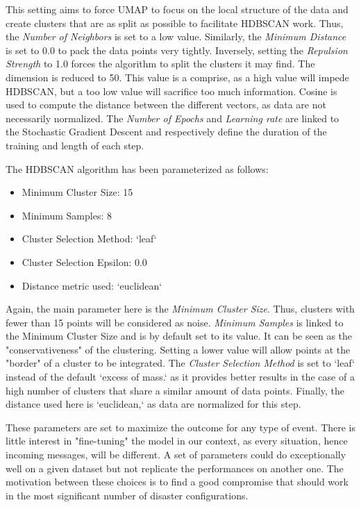 This setting aims to force UMAP to focus on the local structure of the data and create clusters that are as split as possible to facilitate HDBSCAN work.
Thus, the \textit{Number of Neighbors} is set to a low value.
Similarly, the \textit{Minimum Distance} is set to 0.0 to pack the data points very tightly.
Inversely, setting the \textit{Repulsion Strength} to 1.0 forces the algorithm to split the clusters it may find.
The dimension is reduced to 50.
This value is a comprise, as a high value will impede HDBSCAN, but a too low value will sacrifice too much information.
Cosine is used to compute the distance between the different vectors, as data are not necessarily normalized.
The \textit{Number of Epochs} and \textit{Learning rate} are linked to the Stochastic Gradient Descent and respectively define the duration of the training and length of each step.

The HDBSCAN algorithm has been parameterized as follows:

\begin{itemize}
    \item Minimum Cluster Size: 15
    \item Minimum Samples: 8
    \item Cluster Selection Method: `leaf`
    \item Cluster Selection Epsilon: 0.0
    \item Distance metric used: `euclidean`
\end{itemize}

Again, the main parameter here is the \textit{Minimum Cluster Size}.
Thus, clusters with fewer than 15 points will be considered as noise.
\textit{Minimum Samples} is linked to the Minimum Cluster Size and is by default set to its value.
It can be seen as the "conservativeness" of the clustering.
Setting a lower value will allow points at the "border" of a cluster to be integrated.
The \textit{Cluster Selection Method} is set to `leaf` instead of the default `excess of mass.`
as it provides better results in the case of a high number of clusters that share a similar amount of data points.
Finally, the distance used here is `euclidean,` as data are normalized for this step.

These parameters are set to maximize the outcome for any type of event.
There is little interest in "fine-tuning" the model in our context, as every situation, hence incoming messages, will be different.
A set of parameters could do exceptionally well on a given dataset but not replicate the performances on another one.
The motivation between these choices is to find a good compromise that should work in the most significant number of disaster configurations.

